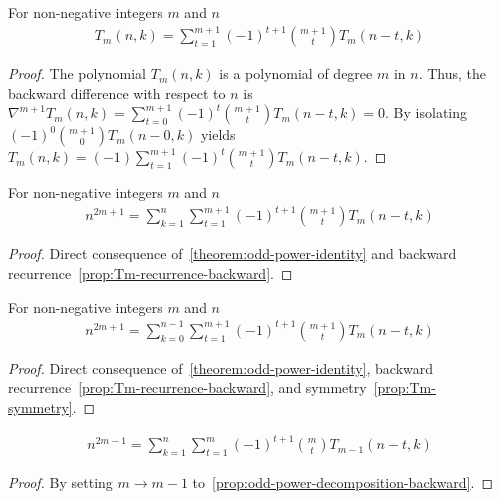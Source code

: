 ﻿\begin{proposition}
    \label{prop:Tm-recurrence-backward}
    For non-negative integers $m$ and $n$
    \begin{align*}
        T_{m} (n, k) = \sum_{t=1}^{m+1} (-1)^{t+1} \binom{m+1}{t} T_{m} (n-t, k)
    \end{align*}
    \begin{proof}
        The polynomial $T_{m} (n,k)$ is a polynomial of degree $m$ in $n$.
        Thus, the backward difference with respect to $n$ is
        $\nabla^{m+1} T_{m} (n, k) = \sum_{t=0}^{m+1} (-1)^{t} \binom{m+1}{t} T_{m} (n-t, k) = 0$.
        By isolating $(-1)^{0} \binom{m+1}{0} T_{m} (n-0, k)$ yields
        $T_{m} (n, k) = (-1) \sum_{t=1}^{m+1} (-1)^{t} \binom{m+1}{t} T_{m} (n-t, k)$.
    \end{proof}
\end{proposition}

\begin{proposition}
    \label{prop:odd-power-decomposition-backward}
    For non-negative integers $m$ and $n$
    \begin{align*}
        n^{2m+1} = \sum_{k=1}^{n} \sum_{t=1}^{m+1} (-1)^{t+1} \binom{m+1}{t} T_{m} (n-t, k)
    \end{align*}
    \begin{proof}
        Direct consequence of~\eqref{theorem:odd-power-identity}
        and backward recurrence~\eqref{prop:Tm-recurrence-backward}.
    \end{proof}
\end{proposition}

\begin{proposition}
    \label{prop:odd-power-decomposition-backward-shifted}
    For non-negative integers $m$ and $n$
    \begin{align*}
        n^{2m+1} = \sum_{k=0}^{n-1} \sum_{t=1}^{m+1} (-1)^{t+1} \binom{m+1}{t} T_{m} (n-t, k)
    \end{align*}
    \begin{proof}
        Direct consequence of~\eqref{theorem:odd-power-identity},
        backward recurrence~\eqref{prop:Tm-recurrence-backward}, and symmetry~\eqref{prop:Tm-symmetry}.
    \end{proof}
\end{proposition}

\begin{corollary}
    \label{cor:odd-power-decomposition-m-1}
    \begin{align*}
        n^{2m-1} = \sum_{k=1}^{n} \sum_{t=1}^{m} (-1)^{t+1} \binom{m}{t} T_{m-1} (n-t, k)
    \end{align*}
    \begin{proof}
        By setting $m \rightarrow m-1$ to~\eqref{prop:odd-power-decomposition-backward}.
    \end{proof}
\end{corollary}

